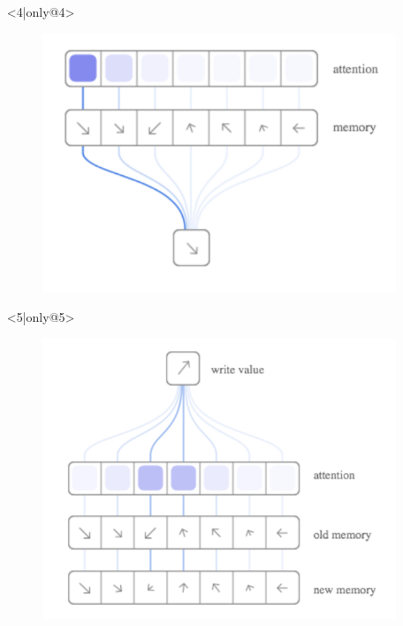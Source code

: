 \documentclass{beamer}
\begin{document}
\begin{frame}
\begin{columns}
\begin{itemize}
\begin{figure}[!h]
\begin{center}
 			\end{center}
 		\end{figure}
 	\item[] <4|only@4> 
		\begin{figure}[!h]
 			\begin{center}
 			\includegraphics[scale=0.24]{"Immagini/Read.png"}
 			\end{center}
 		\end{figure}
 	\item[] <5|only@5> 
		\begin{figure}[!h]
 			\begin{center}
 			\includegraphics[scale=0.24]{"Immagini/Write.png"}
 			\end{center}
 		\end{figure}
\end{itemize}
\end{columns}
\end{frame}
\end{document}
